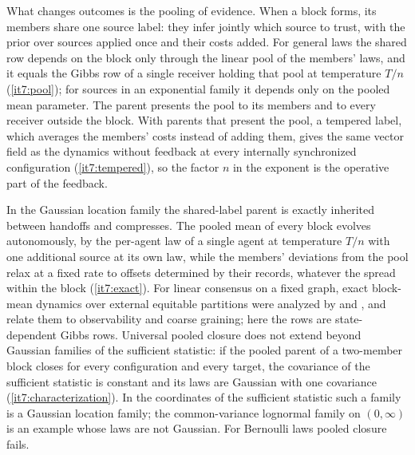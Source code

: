 \documentclass[11pt,letterpaper]{report}
\begin{document}
What changes outcomes is the pooling of evidence. When a block forms, its members share one source label: they infer jointly which source to trust, with the prior over sources applied once and their costs added. For general laws the shared row depends on the block only through the linear pool of the members' laws, and it equals the Gibbs row of a single receiver holding that pool at temperature $T/n$ (\cref{it7:pool}); for sources in an exponential family it depends only on the pooled mean parameter. The parent presents the pool to its members and to every receiver outside the block. With parents that present the pool, a tempered label, which averages the members' costs instead of adding them, gives the same vector field as the dynamics without feedback at every internally synchronized configuration (\cref{it7:tempered}), so the factor $n$ in the exponent is the operative part of the feedback.

In the Gaussian location family the shared-label parent is exactly inherited between handoffs and compresses. The pooled mean of every block evolves autonomously, by the per-agent law of a single agent at temperature $T/n$ with one additional source at its own law, while the members' deviations from the pool relax at a fixed rate to offsets determined by their records, whatever the spread within the block (\cref{it7:exact}). For linear consensus on a fixed graph, exact block-mean dynamics over external equitable partitions were analyzed by \citet{MartiniEgerstedtBicchi2010} and \citet{EgerstedtEtAl2012}, and \citet{OClery2013} relate them to observability and coarse graining; here the rows are state-dependent Gibbs rows. Universal pooled closure does not extend beyond Gaussian families of the sufficient statistic: if the pooled parent of a two-member block closes for every configuration and every target, the covariance of the sufficient statistic is constant and its laws are Gaussian with one covariance (\cref{it7:characterization}). In the coordinates of the sufficient statistic such a family is a Gaussian location family; the common-variance lognormal family on $(0,\infty)$ is an example whose laws are not Gaussian. For Bernoulli laws pooled closure fails.
\end{document}
